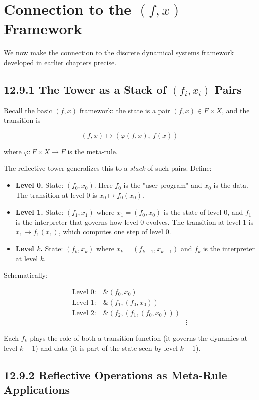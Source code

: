 \section{Connection to the $(f, x)$ Framework}

We now make the connection to the discrete dynamical systems framework developed in earlier chapters precise.

\subsection{12.9.1 The Tower as a Stack of $(f_i, x_i)$ Pairs}

Recall the basic $(f, x)$ framework: the state is a pair $(f, x) \in F \times X$, and the transition is

\[(f, x) \longmapsto (\varphi(f, x),\ f(x))\]

where $\varphi: F \times X \to F$ is the meta-rule.

The reflective tower generalizes this to a \textit{stack} of such pairs. Define:

\begin{itemize}
\item \textbf{Level 0.} State: $(f_0, x_0)$. Here $f_0$ is the "user program" and $x_0$ is the data. The transition at level 0 is $x_0 \mapsto f_0(x_0)$.
\item \textbf{Level 1.} State: $(f_1, x_1)$ where $x_1 = (f_0, x_0)$ is the state of level 0, and $f_1$ is the interpreter that governs how level 0 evolves. The transition at level 1 is $x_1 \mapsto f_1(x_1)$, which computes one step of level 0.
\item \textbf{Level $k$.} State: $(f_k, x_k)$ where $x_k = (f_{k-1}, x_{k-1})$ and $f_k$ is the interpreter at level $k$.
\end{itemize}

Schematically:

$$\begin{aligned}
\text{Level 0:} \quad \& (f_0, x_0) \\
\text{Level 1:} \quad \& (f_1, (f_0, x_0)) \\
\text{Level 2:} \quad \& (f_2, (f_1, (f_0, x_0))) \\
& \vdots
\end{aligned}$$

Each $f_k$ plays the role of both a transition function (it governs the dynamics at level $k - 1$) and data (it is part of the state seen by level $k + 1$).

\subsection{12.9.2 Reflective Operations as Meta-Rule Applications}

